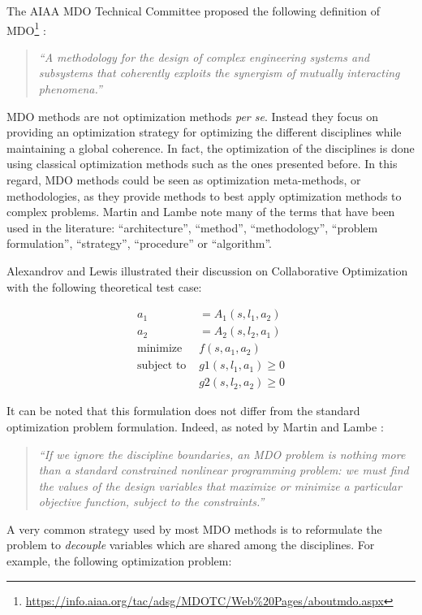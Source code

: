 The AIAA MDO Technical Committee proposed the following definition of MDO\footnote{\url{https://info.aiaa.org/tac/adsg/MDOTC/Web\%20Pages/aboutmdo.aspx}} \cite{american1991current}:
 \begin{quote}\textit{
\enquote{A methodology for the design of complex engineering systems and subsystems that coherently exploits the synergism of mutually interacting phenomena.}}
\end{quote}
MDO methods are not optimization methods \emph{per se}. Instead they focus on providing an optimization strategy for optimizing the different disciplines while maintaining a global coherence. In fact, the optimization of the disciplines is done using classical optimization methods such as the ones presented before. In this regard, MDO methods could be seen as optimization meta-methods, or methodologies, as they provide methods to best apply optimization methods to complex problems. Martin and Lambe \cite{Lambe:2011:A} note many of the terms that have been used in the literature: \enquote{architecture}, \enquote{method}, \enquote{methodology}, \enquote{problem formulation}, \enquote{strategy}, \enquote{procedure} or \enquote{algorithm}.

Alexandrov and Lewis illustrated their discussion on Collaborative Optimization \cite{NataliaM.:2000:ACA:886733} with the following theoretical test case:

\begin{align*}
a_1 &= A_1(s, l_1, a_2) \\
a_2 &= A_2(s, l_2, a_1) \\
\text{minimize } &f(s, a_1, a_2) \\
\text{subject to } &g1(s, l_1, a_1) \geq 0 \\
								&g2(s, l_2, a_2) \geq 0
\end{align*}

It can be noted that this formulation does not differ from the standard optimization problem formulation. Indeed, as noted by Martin and Lambe \cite{Lambe:2011:A}:
 \begin{quote}
 \textit{
 \enquote{If we ignore the discipline boundaries, an MDO problem is nothing more than a standard constrained nonlinear programming problem: we must find the values of the design variables that maximize or minimize a particular objective function, subject to the constraints.}}
\end{quote}
A very common strategy used by most MDO methods is to reformulate the problem to \emph{decouple} variables which are shared among the disciplines. 
For example, the following optimization problem:


